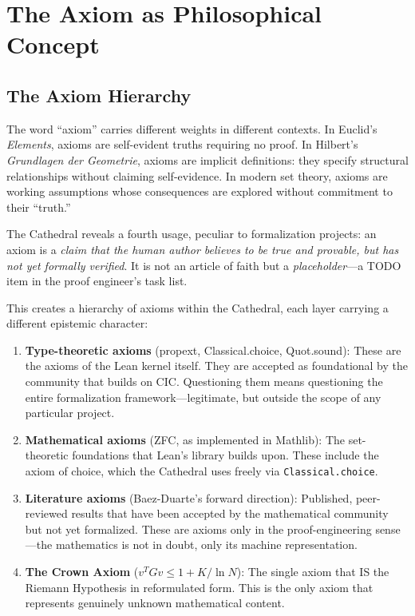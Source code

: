 \section{The Axiom as Philosophical Concept}
\label{sec:axiom}

\subsection{The Axiom Hierarchy}

The word ``axiom'' carries different weights in different contexts.
In Euclid's \emph{Elements}, axioms are self-evident truths
requiring no proof. In Hilbert's \emph{Grundlagen der Geometrie},
axioms are implicit definitions: they specify structural
relationships without claiming self-evidence. In modern set theory,
axioms are working assumptions whose consequences are explored
without commitment to their ``truth.''

The Cathedral reveals a fourth usage, peculiar to formalization
projects: an axiom is a \emph{claim that the human author believes
to be true and provable, but has not yet formally verified}. It is
not an article of faith but a \emph{placeholder}---a TODO item in
the proof engineer's task list.

This creates a hierarchy of axioms within the Cathedral, each
layer carrying a different epistemic character:

\begin{enumerate}
  \item \textbf{Type-theoretic axioms} (propext, Classical.choice,
    Quot.sound): These are the axioms of the Lean kernel itself.
    They are accepted as foundational by the community that builds
    on CIC. Questioning them means questioning the entire
    formalization framework---legitimate, but outside the scope
    of any particular project.

  \item \textbf{Mathematical axioms} (ZFC, as implemented in
    Mathlib): The set-theoretic foundations that Lean's library
    builds upon. These include the axiom of choice, which the
    Cathedral uses freely via \texttt{Classical.choice}.

  \item \textbf{Literature axioms} (Baez-Duarte's forward
    direction): Published, peer-reviewed results that have been
    accepted by the mathematical community but not yet formalized.
    These are axioms only in the proof-engineering sense---the
    mathematics is not in doubt, only its machine representation.

  \item \textbf{The Crown Axiom} ($v^TGv \leq 1 + K/\ln N$):
    The single axiom that IS the Riemann Hypothesis in reformulated
    form. This is the only axiom that represents genuinely unknown
    mathematical content.
\end{enumerate}

